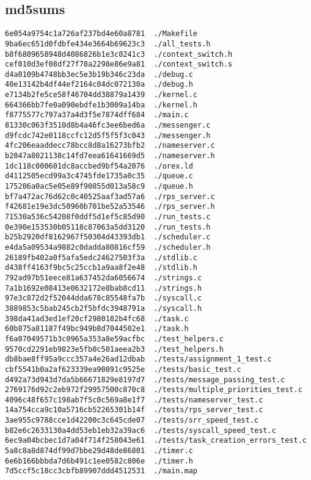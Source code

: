 \documentclass[letterpaper]{article}
\begin{document}
\subsection{md5sums}
\begin{verbatim}
6e054a9754c1a726af237bd4e60a8781  ./Makefile
9ba6ec651d0fdbfe434e3664b69623c3  ./all_tests.h
b8f6809658948d4086826b1e3c0241c3  ./context_switch.h
cef010d3ef08df27f78a2298e86e9a81  ./context_switch.s
d4a0109b4748bb3ec5e3b19b346c23da  ./debug.c
40e13142b4df44ef2164c04dc072130a  ./debug.h
e7134b2fe5ce58f46704dd38879a1439  ./kernel.c
664366bb7fe0a090ebdfe1b3009a14ba  ./kernel.h
f8775577c797a37a4d3f5e7874dff684  ./main.c
81330c063f3510d8b4a46fc3ee6bed6a  ./messenger.c
d9fcdc742e0118ccfc12d5f5f5f3c043  ./messenger.h
4fc206eaaddecc78bcc8d8a16273bfb2  ./nameserver.c
b2047a8021138c14fd7eea61641669d5  ./nameserver.h
1dc118c000601dc8accbed9bf54a2076  ./orex.ld
d4112505ecd99a3c4745fde1735a0c35  ./queue.c
175206a0ac5e05e89f90855d013a58c9  ./queue.h
bf7a472ac76d62c0c40525aaf3ad57a6  ./rps_server.c
f42681e19e3dc50960b701be52a53546  ./rps_server.h
71530a536c54208f0ddf5d1ef5c85d90  ./run_tests.c
0e390e153530b05118c87063a5dd3120  ./run_tests.h
b25b2920df8162967f50304d43393db1  ./scheduler.c
e4da5a09534a9882c0dadda80816cf59  ./scheduler.h
26189fb402a0f5afa5edc24627503f3a  ./stdlib.c
d438ff4163f9bc5c25ccb1a9aa8f2e48  ./stdlib.h
792ad97b51eece81a637452da6056674  ./strings.c
7a1b1692e08413e0632172e8bab8cd11  ./strings.h
97e3c872d2f52044dda678c85548fa7b  ./syscall.c
3889853c5bab245cb2f5bfdc3948791a  ./syscall.h
398da41ad3ed1ef20cf2980182b4fc68  ./task.c
60b875a81187f49bc949b8d7044502e1  ./task.h
f6a07049571b3c0965a353a8e59acfbc  ./test_helpers.c
9570cd2291eb9823e5fb0c501aeea2b3  ./test_helpers.h
db8bae8ff95a9ccc357a4e26ad12dbab  ./tests/assignment_1_test.c
cbf5541b0a2af623339ea90891c9525e  ./tests/basic_test.c
d492a73d943d7da5b66671829e8197d7  ./tests/message_passing_test.c
2769176d92c2eb972f29957500c870c8  ./tests/multiple_priorities_test.c
4096c48f657c198ab7f5c0c569a8e1f7  ./tests/nameserver_test.c
14a754cca9c10a5716cb52265301b14f  ./tests/rps_server_test.c
3ae955c9788cce1d42200c3c645cde07  ./tests/srr_speed_test.c
b82e6c2633130a4dd53eb1eb32a39ac6  ./tests/syscall_speed_test.c
6ec9a04bcbec1d7a04f714f258043e61  ./tests/task_creation_errors_test.c
5a8c8a8d874df99d7bbe29d48de86801  ./timer.c
6e6b166bbbda7d6b491c1ee0582c806e  ./timer.h
7d5ccf5c18cc3cbfb89907ddd4512531  ./main.map
\end{verbatim}
\end{document}
